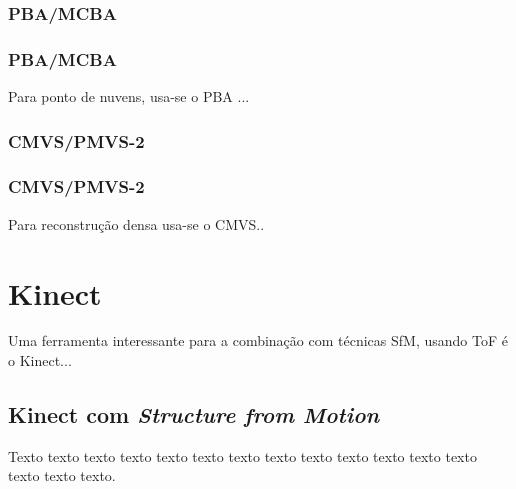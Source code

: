 \documentclass[table, usenames, svgnames, xcolor=dvipsnames]{beamer}
\begin{document}
\subsubsection{PBA/MCBA}

\begin{frame} 
\frametitle{\textbf{PBA/MCBA}}
	\begin{center}
Para ponto de nuvens, usa-se o PBA ...
	\end{center}
\end{frame}

\subsubsection{CMVS/PMVS-2}

\begin{frame} 
\frametitle{\textbf{CMVS/PMVS-2}}
	\begin{center}
Para reconstrução densa usa-se o CMVS..
	\end{center}
\end{frame}

\section{Kinect}

\begin{frame}
	\begin{center}
    	Uma ferramenta interessante para a combinação com técnicas SfM, usando ToF é o Kinect...
	\end{center}
\end{frame}

\subsection{Kinect com \emph{Structure from Motion}}

\begin{frame} 
	\begin{center}
		Texto texto texto texto texto texto texto texto texto texto texto texto texto
		texto texto texto.
	\end{center}
\end{frame}
\end{document}
